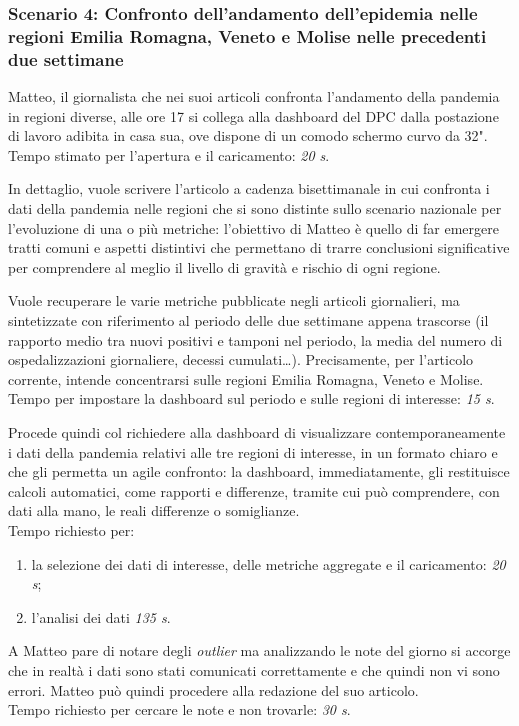 \subsubsection*{Scenario 4: Confronto dell'andamento dell'epidemia nelle regioni Emilia Romagna, Veneto e Molise nelle precedenti due settimane}
Matteo, il giornalista che nei suoi articoli confronta l'andamento della pandemia in regioni diverse, alle ore 17 si collega alla dashboard del DPC dalla postazione di lavoro adibita in casa sua, ove dispone di un comodo schermo curvo da 32".\\
Tempo stimato per l'apertura e il caricamento: \textit{20 s}. 

In dettaglio, vuole scrivere l'articolo a cadenza bisettimanale in cui confronta i dati della pandemia nelle  regioni che si sono distinte sullo scenario nazionale per l'evoluzione di una o più metriche: l'obiettivo di Matteo è quello di far emergere tratti comuni e aspetti distintivi che permettano di trarre conclusioni significative per comprendere al meglio il livello di gravità e rischio di ogni regione.

Vuole recuperare le varie metriche pubblicate negli articoli giornalieri, ma sintetizzate con riferimento al periodo delle due settimane appena trascorse (il rapporto medio tra nuovi positivi e tamponi nel periodo, la media del numero di ospedalizzazioni giornaliere, decessi cumulati…).
Precisamente, per l'articolo corrente, intende concentrarsi sulle regioni Emilia Romagna, Veneto e Molise.\\
Tempo per impostare la dashboard sul periodo e sulle regioni di interesse: \textit{15 s}.

Procede quindi col richiedere alla dashboard di visualizzare contemporaneamente i dati della pandemia relativi alle tre regioni di interesse, in un formato chiaro e che gli permetta un agile confronto: la dashboard, immediatamente, gli restituisce calcoli automatici, come rapporti e differenze, tramite cui può comprendere, con dati alla mano, le reali differenze o somiglianze.\\
Tempo richiesto per:
\begin{enumerate}
    \item la selezione dei dati di interesse, delle metriche aggregate e il caricamento: \textit{20 s};
    \item l'analisi dei dati \textit{135 s}.
\end{enumerate}

A Matteo pare di notare degli \textit{outlier} ma analizzando le note del giorno si accorge che in realtà i dati sono stati comunicati correttamente e che quindi non vi sono errori. Matteo può quindi procedere alla redazione del suo articolo.\\
Tempo richiesto per cercare le note e non trovarle: \textit{30 s}.

